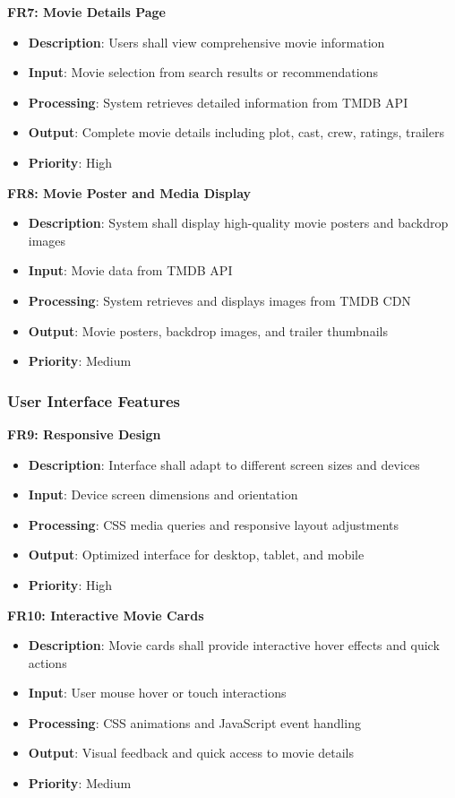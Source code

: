 \documentclass[12pt,a4paper]{article}
\begin{document}
\textbf{FR7: Movie Details Page}
\begin{itemize}
    \item \textbf{Description}: Users shall view comprehensive movie information
    \item \textbf{Input}: Movie selection from search results or recommendations
    \item \textbf{Processing}: System retrieves detailed information from TMDB API
    \item \textbf{Output}: Complete movie details including plot, cast, crew, ratings, trailers
    \item \textbf{Priority}: High
\end{itemize}

\textbf{FR8: Movie Poster and Media Display}
\begin{itemize}
    \item \textbf{Description}: System shall display high-quality movie posters and backdrop images
    \item \textbf{Input}: Movie data from TMDB API
    \item \textbf{Processing}: System retrieves and displays images from TMDB CDN
    \item \textbf{Output}: Movie posters, backdrop images, and trailer thumbnails
    \item \textbf{Priority}: Medium
\end{itemize}

\subsubsection{User Interface Features}

\textbf{FR9: Responsive Design}
\begin{itemize}
    \item \textbf{Description}: Interface shall adapt to different screen sizes and devices
    \item \textbf{Input}: Device screen dimensions and orientation
    \item \textbf{Processing}: CSS media queries and responsive layout adjustments
    \item \textbf{Output}: Optimized interface for desktop, tablet, and mobile
    \item \textbf{Priority}: High
\end{itemize}

\textbf{FR10: Interactive Movie Cards}
\begin{itemize}
    \item \textbf{Description}: Movie cards shall provide interactive hover effects and quick actions
    \item \textbf{Input}: User mouse hover or touch interactions
    \item \textbf{Processing}: CSS animations and JavaScript event handling
    \item \textbf{Output}: Visual feedback and quick access to movie details
    \item \textbf{Priority}: Medium
\end{itemize}
\end{document}
